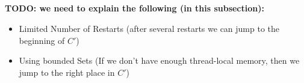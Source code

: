 \ \\ \\ \\ \\
\textbf{TODO: we need to explain the following (in this subsection):}
\begin{itemize}
  \item Limited Number of Restarts (after several restarts we can jump to the beginning of $C'$)
  \item Using bounded Sets (If we don't have enough thread-local memory, then we jump to the right place in $C'$)
\end{itemize}



